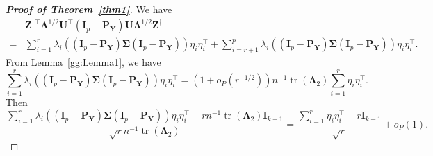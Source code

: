 \documentclass[12pt]{article} %
\DeclareMathOperator{\mytr}{tr}
\newcommand{\bZ}{\mathbf{Z}}
\newcommand{\bP}{\mathbf{P}}
\newcommand{\bY}{\mathbf{Y}}
\newcommand{\bI}{\mathbf{I}}
\newcommand{\bU}{\mathbf{U}}
\newcommand{\bfsym}[1]{\ensuremath{\boldsymbol{#1}}}
\def\bLambda {\bfsym {\Lambda}}
\def\bSigma {\bfsym {\Sigma}}
\theoremstyle{definition}
\begin{document}
\begin{appendices}
\begin{proof}[\textbf{Proof of Theorem~\ref{thm1}}]
    We have
    \begin{equation*}
        \begin{split}
&\bZ^{\dagger \top} \bLambda^{1/2}\bU^\top (\bI_p-\bP_{\bY})\bU\bLambda^{1/2}\bZ^{\dagger}
\\
=&
\sum_{i=1}^r \lambda_i ( (\bI_p-\bP_{\bY})\bSigma (\bI_p-\bP_{\bY}))\eta_i \eta_i^\top
+
\sum_{i=r+1}^p \lambda_i ( (\bI_p-\bP_{\bY})\bSigma (\bI_p-\bP_{\bY}))\eta_i \eta_i^\top.
        \end{split}
    \end{equation*}
    From Lemma~\ref{gg:Lemma1}, we have
    \begin{equation*}
\sum_{i=1}^r \lambda_i ( (\bI_p-\bP_{\bY})\bSigma (\bI_p-\bP_{\bY}))\eta_i \eta_i^\top
=
(1+o_P(r^{-1/2}))n^{-1}\mytr(\bLambda_2)\sum_{i=1}^r \eta_i \eta_i^\top.
    \end{equation*}
    Then
    \begin{equation}\label{lushang1}
        \frac{
\sum_{i=1}^r \lambda_i ( (\bI_p-\bP_{\bY})\bSigma (\bI_p-\bP_{\bY}))\eta_i \eta_i^\top
-rn^{-1}\mytr(\bLambda_2)\bI_{k-1}
}{
    \sqrt r n^{-1}\mytr(\bLambda_2)
}
=\frac{\sum_{i=1}^r \eta_i \eta_i^\top- r\bI_{k-1}}{\sqrt r}
+o_P(1).
    \end{equation}



\end{proof}
\end{appendices}
\end{document}
